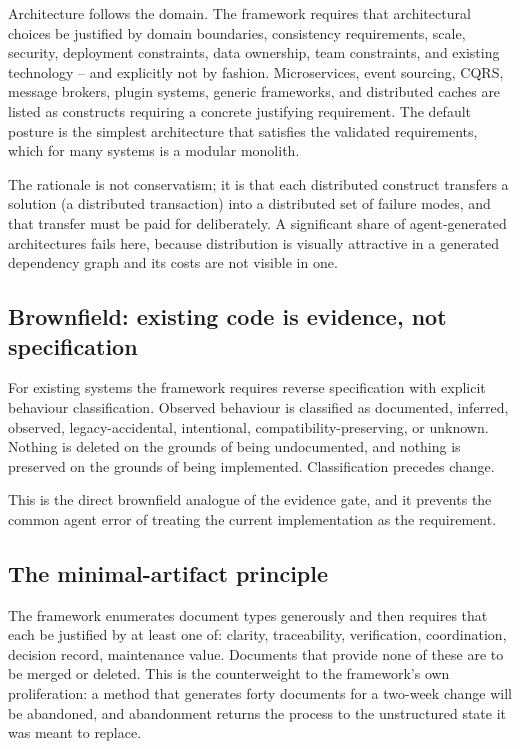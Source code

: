 \documentclass[11pt,a4paper]{article}
\begin{document}
Architecture follows the domain. The framework requires that architectural choices be justified by domain boundaries, consistency requirements, scale, security, deployment constraints, data ownership, team constraints, and existing technology -- and explicitly not by fashion. Microservices, event sourcing, CQRS, message brokers, plugin systems, generic frameworks, and distributed caches are listed as constructs requiring a concrete justifying requirement. The default posture is the simplest architecture that satisfies the validated requirements, which for many systems is a modular monolith.

The rationale is not conservatism; it is that each distributed construct transfers a solution (a distributed transaction) into a distributed set of failure modes, and that transfer must be paid for deliberately. A significant share of agent-generated architectures fails here, because distribution is visually attractive in a generated dependency graph and its costs are not visible in one.

\subsection{Brownfield: existing code is evidence, not specification}

For existing systems the framework requires reverse specification with explicit behaviour classification. Observed behaviour is classified as documented, inferred, observed, legacy-accidental, intentional, compatibility-preserving, or unknown. Nothing is deleted on the grounds of being undocumented, and nothing is preserved on the grounds of being implemented. Classification precedes change.

This is the direct brownfield analogue of the evidence gate, and it prevents the common agent error of treating the current implementation as the requirement.

\subsection{The minimal-artifact principle}

The framework enumerates document types generously and then requires that each be justified by at least one of: clarity, traceability, verification, coordination, decision record, maintenance value. Documents that provide none of these are to be merged or deleted. This is the counterweight to the framework's own proliferation: a method that generates forty documents for a two-week change will be abandoned, and abandonment returns the process to the unstructured state it was meant to replace.
\end{document}
